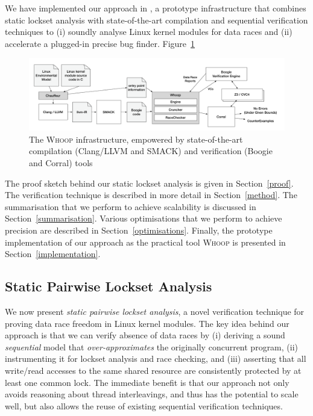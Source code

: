We have implemented our approach in \whoop, a prototype infrastructure that combines static lockset analysis with state-of-the-art compilation and sequential verification techniques to (i) soundly analyse Linux kernel modules for data races and (ii) accelerate a plugged-in precise bug finder. Figure~\ref{fig:whoop}

\begin{figure}
\centering
\includegraphics[width=.99\linewidth]{img/whoop.pdf}
\caption{The \textsc{Whoop} infrastructure, empowered by state-of-the-art compilation (Clang/LLVM and SMACK) and verification (Boogie and Corral) tools}
\label{fig:whoop}
\end{figure}

The proof sketch behind our static lockset analysis is given in Section~\ref{proof}. The verification technique is described in more detail in Section~\ref{method}. The summarisation that we perform to achieve scalability is discussed in Section~\ref{summarisation}. Various optimisations that we perform to achieve precision are described in Section~\ref{optimisations}. Finally, the prototype implementation of our approach as the practical tool \textsc{Whoop} is presented in Section~\ref{implementation}.

\subsection{Static Pairwise Lockset Analysis}
\label{spla}

We now present \emph{static pairwise lockset analysis}, a novel verification technique for proving data race freedom in Linux kernel modules. The key idea behind our approach is that we can verify absence of data races by (i) deriving a sound \emph{sequential} model that \emph{over-approximates} the originally concurrent program, (ii) instrumenting it for lockset analysis and race checking, and (iii) asserting that all write/read accesses to the same shared resource are consistently protected by at least one common lock. The immediate benefit is that our approach not only avoids reasoning about thread interleavings, and thus has the potential to scale well, but also allows the reuse of existing sequential verification techniques.

